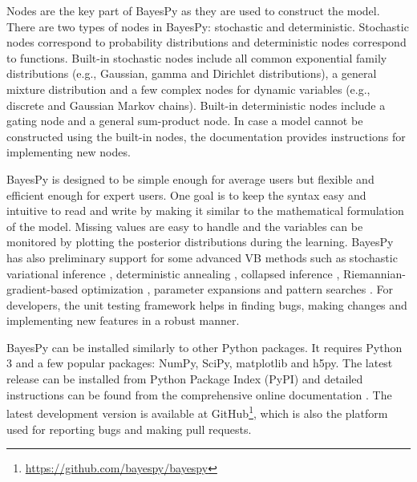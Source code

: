 \documentclass[twoside,11pt]{article}
\begin{document}
Nodes are the key part of BayesPy as they are used to construct the model.
There are two types of nodes in BayesPy: stochastic and deterministic.
Stochastic nodes correspond to probability distributions and deterministic nodes
correspond to functions.  Built-in stochastic nodes include all common
exponential family distributions (e.g., Gaussian, gamma and Dirichlet
distributions), a general mixture distribution and a few complex nodes for
dynamic variables (e.g., discrete and Gaussian Markov chains).  Built-in
deterministic nodes include a gating node and a general sum-product node.
In case a model cannot be constructed using the built-in nodes, the
documentation provides instructions for implementing new nodes.



BayesPy is designed to be simple enough for average users but flexible and
efficient enough for expert users.  One goal is to keep the syntax easy and
intuitive to read and write by making it similar to the mathematical formulation
of the model.  Missing values are easy to handle and the variables can be
monitored by plotting the posterior distributions during the learning.  BayesPy
has also preliminary support for some advanced VB methods such as stochastic
variational inference \citep{Hoffman:2013}, deterministic annealing
\citep{Katahira:2008}, collapsed inference \citep{Hensman:2012},
Riemannian-gradient-based optimization \citep{Honkela:2010}, parameter
expansions \citep{Qi:2007} and pattern searches \citep{Honkela:2003}.  For
developers, the unit testing framework helps in finding bugs, making changes and
implementing new features in a robust manner.



BayesPy can be installed similarly to other Python packages.  It requires Python
3 and a few popular packages: NumPy, SciPy, matplotlib and h5py.  The latest
release can be installed from Python Package Index (PyPI) and detailed
instructions can be found from the comprehensive online documentation
\citep{bayespy.org}.  The latest development version is available at
GitHub\footnote{\url{https://github.com/bayespy/bayespy}}, which is also the
platform used for reporting bugs and making pull requests.




\end{document}
